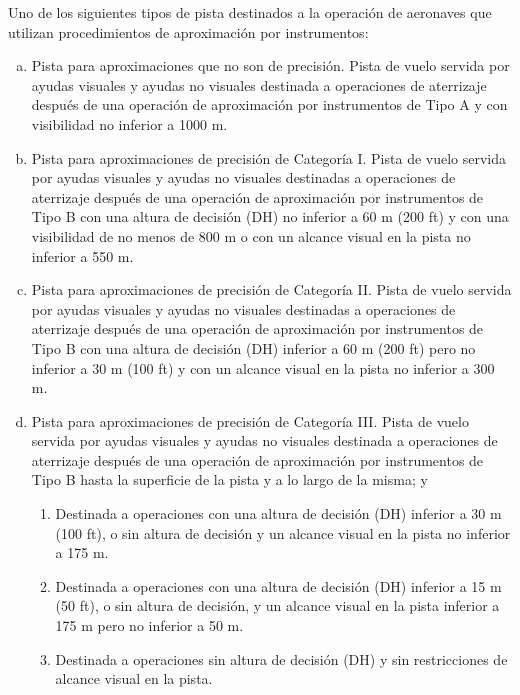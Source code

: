 \begin{tcolorbox}[title= {Pista de vuelo por instrumentos o Pista para aproximaciones de precisión.
    OACI. Anexo 14. Edición 2018}]
  
  {\footnotesize

    Uno de los siguientes tipos de pista destinados a la operación de aeronaves que utilizan
    procedimientos de aproximación por instrumentos:
    
    \begin{enumerate}[a)]
    \item Pista para aproximaciones que no son de precisión. Pista de vuelo servida por ayudas visuales y ayudas no visuales
destinada a operaciones de aterrizaje después de una operación de aproximación por instrumentos de Tipo A y con
visibilidad no inferior a 1000 m.
\item Pista para aproximaciones de precisión de Categoría I. Pista de vuelo servida por ayudas visuales y ayudas no
visuales destinadas a operaciones de aterrizaje después de una operación de aproximación por instrumentos de Tipo B
con una altura de decisión (DH) no inferior a 60 m (200 ft) y con una visibilidad de no menos de 800 m o con un
alcance visual en la pista no inferior a 550 m.
\item Pista para aproximaciones de precisión de Categoría II. Pista de vuelo servida por ayudas visuales y ayudas no
visuales destinadas a operaciones de aterrizaje después de una operación de aproximación por instrumentos de Tipo B
con una altura de decisión (DH) inferior a 60 m (200 ft) pero no inferior a 30 m (100 ft) y con un alcance visual en la
pista no inferior a 300 m.
\item Pista para aproximaciones de precisión de Categoría III. Pista de vuelo servida por ayudas visuales y ayudas no
visuales destinada a operaciones de aterrizaje después de una operación de aproximación por instrumentos de Tipo B
hasta la superficie de la pista y a lo largo de la misma; y

\begin{enumerate}[A ]
\item Destinada a operaciones con una altura de decisión (DH) inferior a 30 m (100 ft), o sin altura de decisión y un
alcance visual en la pista no inferior a 175 m.
\item Destinada a operaciones con una altura de decisión (DH) inferior a 15 m (50 ft), o sin altura de decisión, y un
alcance visual en la pista inferior a 175 m pero no inferior a 50 m.
\item Destinada a operaciones sin altura de decisión (DH) y sin restricciones de alcance visual en la pista.
\end{enumerate}


\end{enumerate}}
\end{tcolorbox}
